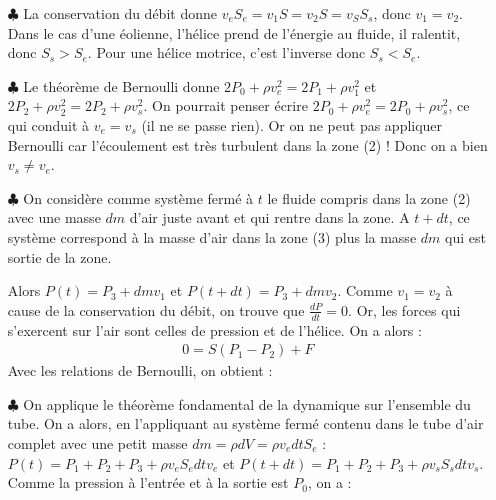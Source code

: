 \documentclass{report}
\begin{document}
\begin{itemize}
	
	\item[$\clubsuit$] La conservation du débit donne $v_eS_e=v_1S=v_2S=v_SS_s$, donc $v_1=v_2$. Dans le cas d'une éolienne, l'hélice prend de l'énergie au fluide, il ralentit, donc $S_s>S_e$. Pour une hélice motrice, c'est l'inverse donc $S_s<S_e$.
	
	\item[$\clubsuit$] Le théorème de Bernoulli donne $2P_0+\rho v_e^2=2P_1+\rho v_1^2$ et $2P_2+\rho v_2^2=2P_2+\rho v_s^2$. On pourrait penser écrire $2P_0+\rho v_e^2=2P_0+\rho v_s^2$, ce qui conduit à $v_e=v_s$ (il ne se passe rien). Or on ne peut pas appliquer Bernoulli car l'écoulement est très turbulent dans la zone (2) ! Donc on a bien $v_s\neq v_e$.
	
	\item[$\clubsuit$] On considère comme système fermé à $t$ le fluide compris dans la zone (2) avec une masse $dm$ d'air juste avant et qui rentre dans la zone. A $t+dt$, ce système correspond à la masse d'air dans la zone (3) plus la masse $dm$ qui est sortie de la zone. 
	
	Alors $P(t)=P_3+dmv_1$ et $P(t+dt)=P_3+dmv_2$. Comme $v_1=v_2$ à cause de la conservation du débit, on trouve que $\frac{dP}{dt}=0$.  Or, les forces qui s'exercent sur l'air sont celles de pression et de l'hélice. On a alors :
	\begin{align*}
		0=S(P_1-P_2)+F
	\end{align*}
	Avec les relations de Bernoulli, on obtient :
	
	\noindent{}
	
	\item[$\clubsuit$] On applique le théorème fondamental de la dynamique sur l'ensemble du tube. On a alors, en l'appliquant au système fermé contenu dans le tube d'air complet avec une petit masse $dm=\rho dV=\rho v_e dt S_e$ : $P(t)=P_1+P_2+P_3+\rho v_e S_e dtv_e$ et $P(t+dt)=P_1+P_2+P_3+\rho v_s S_s dtv_s$. Comme la pression à l'entrée et à la sortie est $P_0$, on a : 
	
	\noindent{}
	

\end{itemize}
\end{document}
